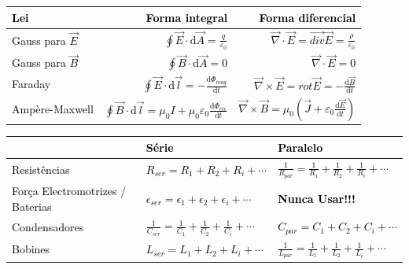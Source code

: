 \documentclass[a4paper,10pt]{extarticle} %
\newcommand{\mybox}[2]{
    \begin{tcolorbox}[colback=lightblue!5!white,colframe=lightblue!75!black,boxsep=1pt,arc=0pt,outer arc=0pt,title={\textcolor{black}{#1}}]
        \textcolor{black}{#2}
    \end{tcolorbox}
}
\begin{document}
\mybox{Equações (Leis) de Maxwell.}{
    \begin{tabular}{||l|r|r||}
        \hline  {\bf Lei} & {\bf Forma integral}&{\bf Forma diferencial}\\
        \hline Gauss para \(\vec{E}\)  & \( \oint \vec{E}\cdot  \mathrm{d}\vec{A}  = \frac{q}{\varepsilon_0} \)
                                       & \(\vec{\nabla} \cdot \vec{E}  = \vec{div} \vec{E}  = \frac{\rho}{\varepsilon_0} \)\\
        \hline Gauss para \(\vec{B}\)  & \( \oint \vec{B}\cdot  \mathrm{d}\vec{A}  = 0 \) &\( \vec{\nabla} \cdot \vec{E}  = 0 \)\\
        \hline Faraday  & \( \oint \vec{E} \cdot  \mathrm{d}\vec{l}  = -\frac{\mathrm{d}\Phi_{mag}}{\mathrm{d} t} \) 
                        &\( \vec{\nabla} \times \vec{E} =  rot \vec{E} = -\frac{\mathrm{d}\vec{B}}{\mathrm{d} t} \)\\
        \hline Ampère-Maxwell  & \( \oint \vec{B} \cdot  \mathrm{d}\vec{l}  = \mu_0 I +\mu_0 \varepsilon_0\frac{\mathrm{d}\Phi_{ele}}{\mathrm{d} t} \)
                               &\( \vec{\nabla} \times \vec{B}  = \mu_0 \left( \vec{J}  + \varepsilon_0\frac{\mathrm{d}\vec{E}}{\mathrm{d} t} \right) \)\\
        \hline
    \end{tabular} 
}
\mybox{Associações de Componentes}{
    \begin{tabular}{||l|l|l||}
        \hline & {\bf Série} &{\bf Paralelo}\\
        \hline  Resistências & $ R_{ser} = R_1 + R_2 + R_i  + \cdots $ & $\frac{1}{R_{par}} = \frac{1}{R_1} +\frac{1}{R_2}+\frac{1}{R_i}+ \cdots$ \\ 
        \hline  Força Electromotrizes / Baterias & $\epsilon_{ser} = \epsilon_1 +\epsilon_2 + \epsilon_i  + \cdots $ & {\bf Nunca Usar!!!}\\ 
        \hline  Condensadores & $\frac{1}{C_{ser}} = \frac{1}{C_1} +\frac{1}{C_2}+\frac{1}{C_i}+ \cdots$ & $ C_{par} = C_1 + C_2 + C_i  + \cdots $ \\ 
        \hline  Bobines & $ L_{ser} = L_1+ L_2 + L_i  + \cdots $ & $\frac{1}{L_{par}} = \frac{1}{L_1} +\frac{1}{L_2}+\frac{1}{L_i}+ \cdots$ \\ 
        \hline
    \end{tabular}
}
\end{document}
